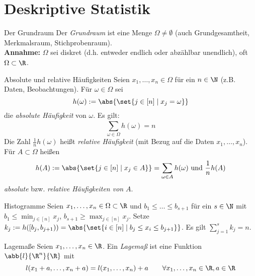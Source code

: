 \section*{Deskriptive Statistik}

\begin{karte}{Der Grundraum}
	Der \textit{Grundraum} ist eine Menge $\Omega \neq \emptyset$ (auch Grundgesamtheit, Merkmalsraum, Stichprobenraum). \\
	\textbf{Annahme:} $\Omega$ sei diskret (d.h. entweder endlich oder abzählbar unendlich), oft $\Omega \subset \R$.
\end{karte}

\begin{karte}{Absolute und relative Häufigkeiten}
	Seien $x_1,\dotsc,x_n \in \Omega$ für ein $n \in \N$ (z.B. Daten, Beobachtungen). Für $\omega \in \Omega$ sei
	\[h(\omega):=\abs{\set{j \in [ n ] \;|\; x_j=\omega }} \]
	die \textit{absolute Häufigkeit} von $\omega$. Es gilt:
	\[\sum_{\omega \in \Omega}^{} h(\omega) = n\]
	Die Zahl $\frac{1}{n}h(\omega)$ heißt \textit{relative Häufigkeit} (mit Bezug auf die Daten $x_1,\dotsc,x_n$). Für $A \subset \Omega$ heißen
	\[h(A):=\abs{\set{j \in [n] \;|\; x_j \in A}} = \sum_{\omega \in A} h(\omega) \text{ und } \frac{1}{n} h(A) \]
	\textit{absolute} bzw. \textit{relative Häufigkeiten von} $A$.
\end{karte}

\begin{karte}{Histogramme}
	Seien $x_1,\dotsc,x_n \in \Omega \subset \R$ und $b_1\le\dotsc\le b_{s+1}$ für ein $s \in \N$ mit $\displaystyle b_1 \leq \min_{j \in [n]} x_j$, $\displaystyle b_{s+1} \ge \max_{j \in [n]} x_j$. Setze $k_j:=h([b_j, b_{j+1})) = \abs{\set{i \in [n] \;|\; b_j \leq x_i \leq b_{j+1}}}$. Es gilt $\displaystyle \sum_{j=1}^{s} k_j = n$.
\end{karte}

\begin{karte}{Lagemaße}
	Seien $x_1,\dotsc,x_n \in \R$. Ein \textit{Lagemaß} ist eine Funktion $\abb{l}{\R^n}{\R}$ mit 
	\[l(x_1+a,\dotsc,x_n+a) = l(x_1,\dotsc,x_n)+a \qquad \forall x_1,\dotsc,x_n \in \R, a \in \R\]
	
\end{karte}

